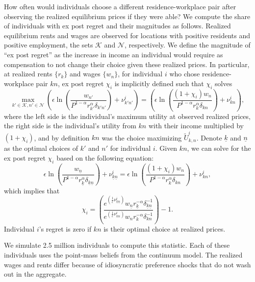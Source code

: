 \documentclass[11pt]{article}
\theoremstyle{definition}
\begin{document}
How often would individuals choose a different residence-workplace pair after observing the realized equilibrium prices if they were able?
We compute the share of individuals with ex post regret and their magnitudes as follows.
Realized equilibrium rents and wages are observed for locations with positive residents and positive employment, the sets $\mathcal{K}$ and $\mathcal{N}$, respectively.
We define the magnitude of ``ex post regret'' as
the increase in income an individual would require as compensation to not change their choice given these realized prices.
In particular,
at realized rents $\{r_k\}$ and wages $\{w_n\}$, 
for individual $i$ who chose residence-workplace pair $kn$,
ex post regret $\chi_i$ is implicitly defined such that $\chi_i$ solves
\begin{equation*}
\max_{k'\in \mathcal{K},n' \in \mathcal{N}}
\left( \epsilon \ln\left(\frac{{w}_{n'}}{{P}^{1-\alpha}{r}_{k'}^{\alpha} \delta_{k'n'}}\right)
+ \nu_{k'n'}^i \right)  = \left( \epsilon \ln\left(\frac{(1+\chi_i) {w}_n}{{P}^{1-\alpha}{r}_{k}^{\alpha} \delta_{kn}}\right) + \nu_{kn}^i \right)   
,\end{equation*}
where 
the left side is the individual's maximum utility at observed realized prices,
the right side is the individual's utility from $kn$ with their income multiplied by $(1+\chi_i)$,
and
by definition $kn$ was the choice maximizing $\tilde{U}_{k,n}^{i}$.
Denote $\underline{k}$ and $\underline{n}$ as the optimal choices of $k'$ and $n'$ for individual $i$.
Given $kn$, we can solve for the ex post regret $\chi_i$ based on the following equation:
\begin{equation*}
	\epsilon \ln\left(\frac{w_{\underline{n}}}{P^{1-\alpha} r_{\underline{k}}^\alpha \delta_{\underline{k}\underline{n}}}\right) + \nu^i_{\underline{k}\underline{n}} = 
	\epsilon \ln\left(\frac{(1+\chi_i) w_{n}}{P^{1-\alpha} r_{k}^\alpha \delta_{kn}}\right) + \nu^i_{kn}
,
\end{equation*}
which implies that 
\begin{equation}
	\chi_i =
	\left(\frac{ e^{\left(\frac{1}{\epsilon}\nu^i_{\underline{k}\underline{n}}\right)}   w_{\underline{n}} r_{\underline{k}}^{-\alpha} \delta_{\underline{k}\underline{n}}^{-1}}{e^{\left(\frac{1}{\epsilon}\nu^i_{kn}\right)} w_n r_k^{-\alpha} \delta_{kn}^{-1}} \right)
	- 1
.\end{equation}
Individual $i$'s regret is zero if $kn$ is their optimal choice at realized prices.

We simulate 2.5 million individuals to compute this statistic.
Each of these individuals uses the point-mass beliefs from the continuum model.
The realized wages and rents differ because of idiosyncratic preference shocks that do not wash out in the aggregate.
\end{document}
